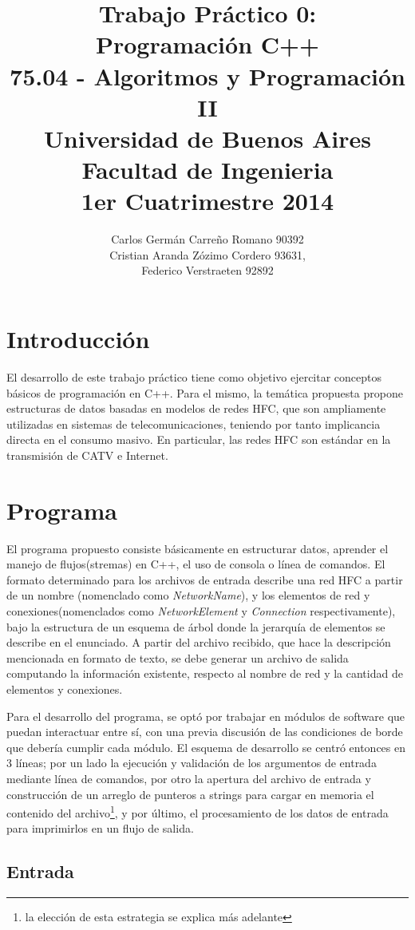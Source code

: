 \documentclass[10pt,a4paper]{report}
\author{ Carlos Germán Carreño Romano 90392\\
 Cristian Aranda Zózimo Cordero 93631,\\
  Federico Verstraeten 92892}
\title{Trabajo Práctico 0:\\
Programación C++\\
75.04 - Algoritmos y Programación II\\
Universidad de Buenos Aires\\
Facultad de Ingenieria\\
1er Cuatrimestre 2014\\ 
}
\begin{document}
\maketitle
\tableofcontents
\section{Introducción}
El desarrollo de este trabajo práctico tiene como objetivo ejercitar conceptos básicos de programación en C++. Para el mismo, la temática propuesta propone estructuras de datos basadas en modelos de redes HFC, que son ampliamente utilizadas en sistemas de telecomunicaciones, teniendo por tanto implicancia directa en el consumo masivo. En particular, las redes HFC son estándar en la transmisión de CATV e Internet.

\section{Programa}

El programa propuesto consiste básicamente en estructurar datos, aprender el manejo de flujos(stremas) en C++, el uso de consola o línea de comandos. El formato determinado para los archivos de entrada describe una red HFC a partir de un nombre (nomenclado como \textit{NetworkName}), y los elementos de red y conexiones(nomenclados como \textit{NetworkElement} y \textit{Connection} respectivamente), bajo la estructura de un esquema de árbol donde la jerarquía de elementos se describe en el enunciado. A partir del archivo recibido, que hace la descripción mencionada en formato de texto, se debe generar un archivo de salida computando la información existente, respecto al nombre de red y  la cantidad de elementos y conexiones.

Para el desarrollo del programa, se optó por trabajar en módulos de software que puedan interactuar entre sí, con una previa discusión de las condiciones de borde que debería cumplir cada módulo. El esquema de desarrollo se centró entonces en 3 líneas; por un lado la ejecución y validación de los argumentos de entrada mediante línea de comandos, por otro la apertura del archivo de entrada y construcción de un arreglo de punteros a strings para cargar en memoria el contenido del archivo\footnote{la elección de esta estrategia se explica más adelante}, y por último, el procesamiento de los datos de entrada para imprimirlos en un flujo de salida.

\subsection{Entrada}
\end{document}
